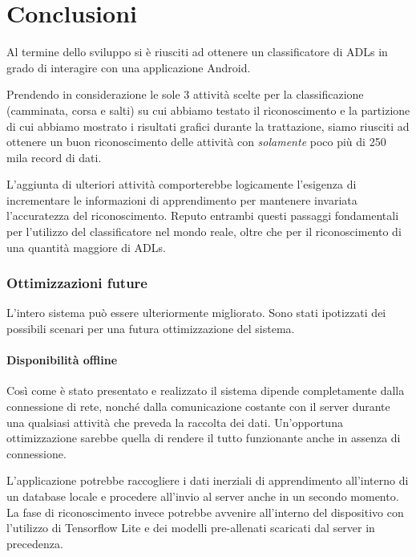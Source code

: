 \chapter{Conclusioni}
Al termine dello sviluppo si è riusciti ad ottenere un classificatore di ADLs in grado di interagire con una applicazione Android.

\vspace{5mm} %

Prendendo in considerazione le sole 3 attività scelte per la classificazione (camminata, corsa e salti) su cui abbiamo testato il riconoscimento 
e la partizione di cui abbiamo mostrato i risultati grafici durante la trattazione, siamo riusciti ad ottenere un buon riconoscimento 
delle attività con \textit{solamente} poco più di 250 mila record di dati.

\vspace{5mm} %

L'aggiunta di ulteriori attività comporterebbe logicamente l'esigenza di incrementare le informazioni di apprendimento per mantenere 
invariata l'accuratezza del riconoscimento. Reputo entrambi questi passaggi fondamentali per l'utilizzo del 
classificatore nel mondo reale, oltre che per il riconoscimento di una quantità maggiore di ADLs.

\subsection*{Ottimizzazioni future}
L'intero sistema può essere ulteriormente migliorato. 
Sono stati ipotizzati dei possibili scenari per una futura ottimizzazione del sistema.

\subsubsection{Disponibilità offline}
Così come è stato presentato e realizzato il sistema dipende completamente dalla connessione di rete, nonché dalla comunicazione costante con il server 
durante una qualsiasi attività che preveda la raccolta dei dati.
Un'opportuna ottimizzazione sarebbe quella di rendere il tutto funzionante anche in assenza di connessione.

\vspace{5mm} %
L'applicazione potrebbe raccogliere i dati inerziali di apprendimento all'interno di un database locale e procedere all'invio al server 
anche in un secondo momento. La fase di riconoscimento invece potrebbe avvenire all'interno del dispositivo con 
l'utilizzo di Tensorflow Lite \cite{tensorflow_lite} e dei modelli pre-allenati scaricati dal server in precedenza.

